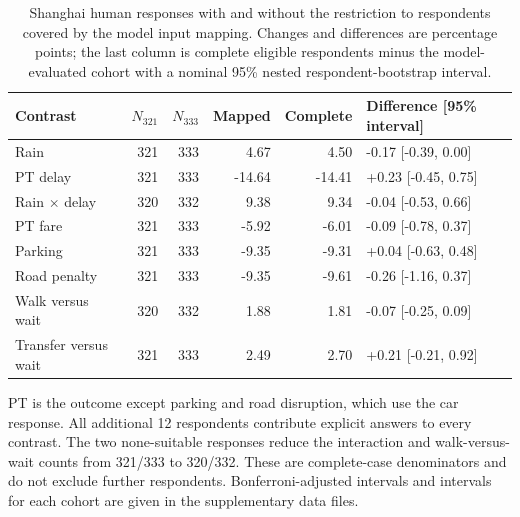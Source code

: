 \begin{table}[pos=htbp]
\centering\footnotesize
\caption{Shanghai human responses with and without the restriction to respondents covered by the model input mapping. Changes and differences are percentage points; the last column is complete eligible respondents minus the model-evaluated cohort with a nominal 95\% nested respondent-bootstrap interval.}
\label{tab:sample_flow_response}
\setlength{\tabcolsep}{3pt}
\renewcommand{\arraystretch}{1.13}
\begin{tabular*}{\linewidth}{@{\extracolsep{\fill}}lrrrrl@{}}
\toprule
Contrast & $N_{321}$ & $N_{333}$ & Mapped & Complete & Difference [95\% interval] \\
\midrule
Rain & 321 & 333 & 4.67 & 4.50 & -0.17 [-0.39, 0.00] \\
PT delay & 321 & 333 & -14.64 & -14.41 & +0.23 [-0.45, 0.75] \\
Rain $\times$ delay & 320 & 332 & 9.38 & 9.34 & -0.04 [-0.53, 0.66] \\
PT fare & 321 & 333 & -5.92 & -6.01 & -0.09 [-0.78, 0.37] \\
Parking & 321 & 333 & -9.35 & -9.31 & +0.04 [-0.63, 0.48] \\
Road penalty & 321 & 333 & -9.35 & -9.61 & -0.26 [-1.16, 0.37] \\
Walk versus wait & 320 & 332 & 1.88 & 1.81 & -0.07 [-0.25, 0.09] \\
Transfer versus wait & 321 & 333 & 2.49 & 2.70 & +0.21 [-0.21, 0.92] \\
\bottomrule
\end{tabular*}
\par\smallskip\begin{minipage}{\linewidth}\footnotesize
PT is the outcome except parking and road disruption, which use the car response. All additional 12 respondents contribute explicit answers to every contrast. The two none-suitable responses reduce the interaction and walk-versus-wait counts from 321/333 to 320/332. These are complete-case denominators and do not exclude further respondents. Bonferroni-adjusted intervals and intervals for each cohort are given in the supplementary data files.
\end{minipage}
\end{table}